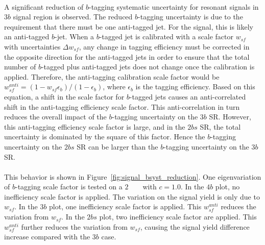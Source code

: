 \paragraph{}
A significant reduction of $b$-tagging systematic uncertainty for resonant signals in $3b$ signal region is observed. 
The reduced $b$-tagging uncertainty is due to the requirement that there must be one anti-tagged jet.
For the signal, this is likely an anti-tagged $b$-jet.
When a $b$-tagged jet is calibrated with a scale factor $w_{sf}$ with uncertainties $\Delta w_{sf}$, any change in tagging efficiency must be corrected in the opposite direction for the anti-tagged jets in order to ensure that the total number of $b$-tagged plus anti-tagged jets does not change once the calibration is applied. 
Therefore, the anti-tagging calibration scale factor would be $w_{sf}^{anti} = (1 - w_{sf} \epsilon_{b}) / (1 - \epsilon_{b}) $, where $\epsilon_{b}$ is the tagging efficiency. 
Based on this equation, a shift in the scale factor for $b$-tagged jets causes an anti-correlated shift in the anti-tagging efficiency scale factor. 
This anti-correlation in turn reduces the overall impact of the $b$-tagging uncertainty on the $3b$ SR. 
However, this anti-tagging efficiency scale factor is large, and in the $2bs$ SR, the total uncertainty is dominated by the square of this factor. 
Hence the $b$-tagging uncertainty on the $2bs$ SR can be larger than the $b$-tagging uncertainty on the $3b$ SR.

\paragraph{}
This behavior is shown in Figure~\ref{fig:signal_bsyst_reduction}.
One eigenvariation of $b$-tagging scale factor is tested on a $2$ \TeV~ \Grav~ with $c=1.0$.
In the $4b$ plot, no inefficiency scale factor is applied. 
The variation on the signal yield is only due to $w_{sf}$.
In the $3b$ plot, one inefficiency scale factor is applied. 
This $w_{sf}^{anti}$ reduces the variation from $w_{sf}$.
In the $2bs$ plot, two inefficiency scale factor are applied. 
This $w_{sf}^{anti}$ further reduces the variation from $w_{sf}$, causing the signal yield difference increase compared with the $3b$ case.


